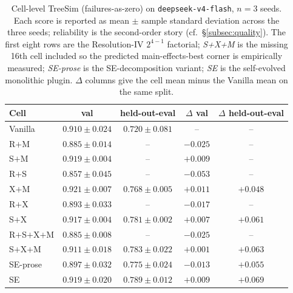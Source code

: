 \documentclass{article}
\begin{document}
\begin{table}[t]
  \caption{Cell-level TreeSim (failures-as-zero) on \texttt{deepseek-v4-flash}, $n=3$ seeds. Each score is reported as mean $\pm$ sample standard deviation across the three seeds; reliability is the second-order story (cf.\ \S\ref{subsec:quality}). The first eight rows are the Resolution-IV $2^{4-1}$ factorial; \emph{S+X+M} is the missing 16th cell included so the predicted main-effects-best corner is empirically measured; \emph{SE-prose} is the SE-decomposition variant; \emph{SE} is the self-evolved monolithic plugin. $\Delta$ columns give the cell mean minus the Vanilla mean on the same split.}
  \label{tab:main-results}
  \centering
  \small
  \begin{tabular}{lcccc}
    \toprule
    \textbf{Cell} & \textbf{val} & \textbf{held-out-eval} & \textbf{$\Delta$ val} & \textbf{$\Delta$ held-out-eval} \\
    \midrule
    Vanilla        & $0.910 \pm 0.024$           & $0.720 \pm 0.081$            & --                & --                \\
    R$+$M          & $0.885 \pm 0.014$           & --                           & $-0.025$          & --                \\
    S$+$M          & $0.919 \pm 0.004$           & --                           & $+0.009$          & --                \\
    R$+$S          & $0.857 \pm 0.045$           & --                           & $-0.053$          & --                \\
    X$+$M          & $\mathbf{0.921 \pm 0.007}$  & $0.768 \pm 0.005$            & $\mathbf{+0.011}$ & $+0.048$          \\
    R$+$X          & $0.893 \pm 0.033$           & --                           & $-0.017$          & --                \\
    S$+$X          & $0.917 \pm 0.004$           & $0.781 \pm \mathbf{0.002}$   & $+0.007$          & $+0.061$          \\
    R$+$S$+$X$+$M  & $0.885 \pm 0.008$           & --                           & $-0.025$          & --                \\
    S$+$X$+$M      & $0.911 \pm 0.018$           & $0.783 \pm 0.022$            & $+0.001$          & $+0.063$          \\
    SE-prose       & $0.897 \pm 0.032$           & $0.775 \pm 0.024$            & $-0.013$          & $+0.055$          \\
    SE             & $0.919 \pm 0.020$           & $\mathbf{0.789 \pm 0.012}$   & $+0.009$          & $\mathbf{+0.069}$ \\
    \bottomrule
  \end{tabular}
\end{table}
\end{document}
